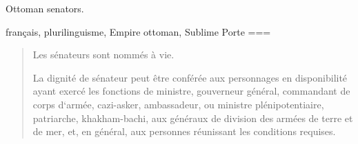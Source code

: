 Ottoman senators.

français, plurilinguisme, Empire ottoman, Sublime Porte
===
\begin{quote}
Les sénateurs sont nommés à vie.

La dignité de sénateur peut être conférée aux personnages en disponibilité ayant exercé les fonctions de ministre, gouverneur général, commandant de corps d‘armée, cazi-asker, ambassadeur, ou ministre plénipotentiaire, patriarche, khakham-bachi, aux généraux de division des armées de terre et de mer, et, en général, aux personnes réunissant les conditions requises.
\end{quote}
\nocite{strauss2010}
